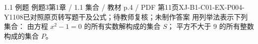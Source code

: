\par\noindent\begin{minipage}{\linewidth}
\begin{bankitem}{1.1 例题 例题3}{第1章 / 1.1 集合 / 教材 p.4 / PDF 第11页}{XJ-B1-C01-EX-P004-Y1108}{已对照原页转写题干及公式；待教师复核；未制作答案}
用列举法表示下列集合：
由方程 $x^2-1=0$ 的所有实数解构成的集合 $S$；
平方不大于 9 的所有整数构成的集合 $P$。
\end{bankitem}
\end{minipage}\par\medskip
